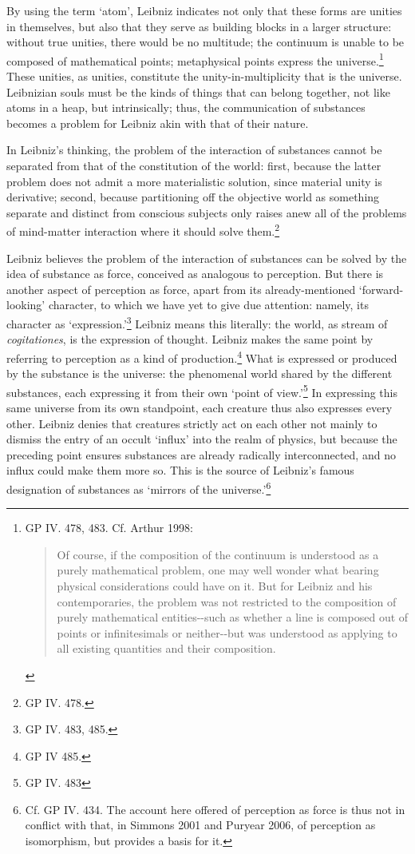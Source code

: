 \documentclass{article}
\begin{document}
By using the term `atom', Leibniz indicates not only that these forms
are unities in themselves, but also that they serve as building blocks
in a larger structure: without true unities, there would be no
multitude; the continuum is unable to be composed of mathematical
points; metaphysical points express the universe.\footnote{GP IV. 478,
  483. Cf. Arthur 1998:

  \begin{quote}
  Of course, if the composition of the continuum is understood as a
  purely mathematical problem, one may well wonder what bearing physical
  considerations could have on it. But for Leibniz and his
  contemporaries, the problem was not restricted to the composition of
  purely mathematical entities-\/-such as whether a line is composed out
  of points or infinitesimals or neither-\/-but was understood as
  applying to all existing quantities and their composition.
  \end{quote}} These unities, as unities, constitute the
unity-in-multiplicity that is the universe. Leibnizian souls must be the
kinds of things that can belong together, not like atoms in a heap, but
intrinsically; thus, the communication of substances becomes a problem
for Leibniz akin with that of their nature.

In Leibniz's thinking, the problem of the interaction of substances
cannot be separated from that of the constitution of the world: first,
because the latter problem does not admit a more materialistic solution,
since material unity is derivative; second, because partitioning off the
objective world as something separate and distinct from conscious
subjects only raises anew all of the problems of mind-matter interaction
where it should solve them.\footnote{GP IV. 478.}

Leibniz believes the problem of the interaction of substances can be
solved by the idea of substance as force, conceived as analogous to
perception. But there is another aspect of perception as force, apart
from its already-mentioned `forward-looking' character, to which we have
yet to give due attention: namely, its character as
`expression.'\footnote{GP IV. 483, 485.} Leibniz means this literally:
the world, as stream of \emph{cogitationes}, is the expression of
thought. Leibniz makes the same point by referring to perception as a
kind of production.\footnote{GP IV 485.} What is expressed or produced
by the substance is the universe: the phenomenal world shared by the
different substances, each expressing it from their own `point of
view.'\footnote{GP IV. 483} In expressing this same universe from its
own standpoint, each creature thus also expresses every other. Leibniz
denies that creatures strictly act on each other not mainly to dismiss
the entry of an occult `influx' into the realm of physics, but because
the preceding point ensures substances are already radically
interconnected, and no influx could make them more so. This is the
source of Leibniz's famous designation of substances as `mirrors of the
universe.'\footnote{Cf. GP IV. 434. The account here offered of
  perception as force is thus not in conflict with that, in Simmons 2001
  and Puryear 2006, of perception as isomorphism, but provides a basis
  for it.}
\end{document}
